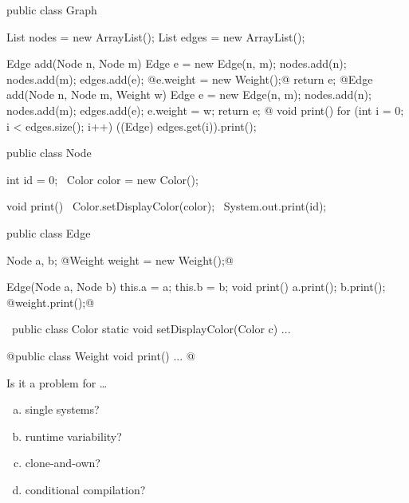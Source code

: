 
\begin{frame}[fragile]{\myframetitle}
	\small\begin{mycolumns}[columns=3,T,animation=none,widths={43,32}]
\begin{codetight}{}
public class Graph {
	List nodes = new ArrayList();
	List edges = new ArrayList();

	Edge add(Node n, Node m) {
		Edge e = new Edge(n, m);
		nodes.add(n); nodes.add(m); edges.add(e);
		@e.weight = new Weight();@
		return e;
	}
	@Edge add(Node n, Node m, Weight w) {
		Edge e = new Edge(n, m);
		nodes.add(n); nodes.add(m); edges.add(e);
		e.weight = w;
		return e;
	}@
	void print() {
		for (int i = 0; i < edges.size(); i++) {
			((Edge) edges.get(i)).print();
		}
	}
}
\end{codetight} %
		\mynextcolumn
\begin{codetight}{}
public class Node {
	int id = 0;
	~Color color = new Color();~

	void print() {
		~Color.setDisplayColor(color);~
		System.out.print(id);
	}
}
\end{codetight}
\begin{codetight}{}
public class Edge {
	Node a, b;
	@Weight weight = new Weight();@

	Edge(Node a, Node b) {
		this.a = a; this.b = b;
	}
	void print() {
		a.print(); b.print();
		@weight.print();@
	}
}
\end{codetight}
		\mynextcolumn
\begin{codetight}{}
~public class Color {
	static void setDisplayColor(Color c) {...}
}~
\end{codetight}	
\begin{codetight}{}
@public class Weight {
	void print() {...}
}@
\end{codetight}
		\pause
		\begin{note}{Is it a problem for \ldots}
			\setlength\leftmargini{4mm}
			\begin{enumerate}[(a)]
				\item single systems? 
				\item runtime variability?\\\mysource{\lectureruntime}
				\item clone-and-own?\\\mysource{\lecturecloneandown}
				\item conditional compilation?\mysource{\lecturefeatures}
			\end{enumerate}
		\end{note}
	\end{mycolumns}
\end{frame}

